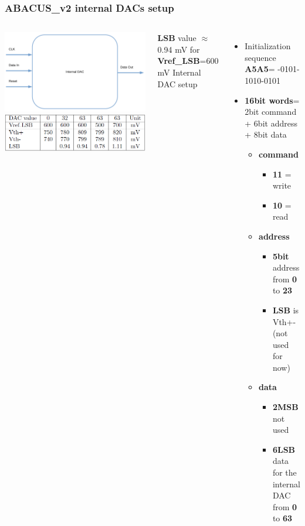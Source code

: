 \documentclass[aspectratio=169]{beamer}
\begin{document}
		\begin{frame}
	\frametitle{ABACUS\_v2 internal DACs setup}	
	\begin{columns}
		\begin{center}
			\includegraphics[width=0.7 \textwidth]{IMG/InternalDAC.pdf}
			\includegraphics[width=0.7 \textwidth]{IMG/TableLSB.PNG}
		\end{center}
		\textbf{LSB} value $\approx$0.94 mV for \textbf{Vref\_LSB}=600 mV
		{\color{blue} Internal DAC setup}
		\begin{itemize}
			\item Initialization sequence \textbf{A5A5}= 
			-0101-1010-0101
			\item \textbf{16bit words}= \newline 2bit command + 6bit address + 8bit data
			\begin{itemize}
				\item \textbf{command}
				\begin{itemize}
					\item \textbf{11} = write
					\item \textbf{10} = read
				\end{itemize}
				\item \textbf{address}
				\begin{itemize}
					\item \textbf{5bit} address from \textbf{0} to \textbf{23}
					\item \textbf{LSB} is Vth+- (not used for now)
				\end{itemize}
				\item \textbf{data}
				\begin{itemize}
					\item \textbf{2MSB} not used
					\item \textbf{6LSB} data for the internal DAC \newline from \textbf{0} to \textbf{63}
				\end{itemize}
			\end{itemize} 
		\end{itemize}
	\end{columns}
	\end{frame}
\end{document}
